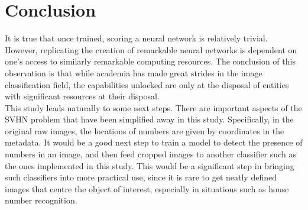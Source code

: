 \documentclass[12pt]{article}
\begin{document}
\section{Conclusion}

It is true that once trained, scoring a neural network is relatively trivial. However, replicating the creation of remarkable neural networks is dependent on one's access to similarly remarkable computing resources. The conclusion of this observation is that while academia has made great strides in the image classification field, the capabilities unlocked are only at the disposal of entities with significant resources at their disposal.\\

This study leads naturally to some next steps. There are important aspects of the SVHN problem that have been simplified away in this study. Specifically, in the original raw images, the locations of numbers are given by coordinates in the metadata. It would be a good next step to train a model to detect the presence of numbers in an image, and then feed cropped images to another classifier such as the ones implemented in this study. This would be a significant step in bringing such classifiers into more practical use, since it is rare to get neatly defined images that centre the object of interest, especially in situations such as house number recognition.

\medskip
 
\renewcommand\refname{Bibliography}

 
\end{document}
